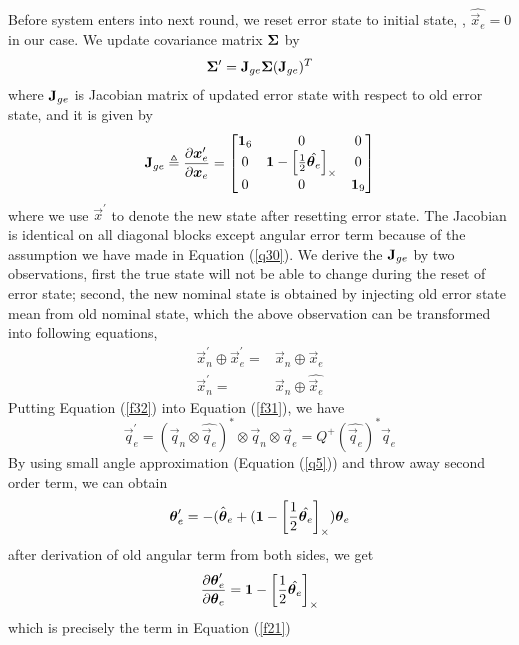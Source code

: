 Before system enters into next round, we reset error state to initial state, \ie, $\hat{\vec{x}_e} = 0$ in our case. We update covariance matrix $\mathbf{\Sigma}$ by
\begin{equation}\label{f20}
	\mathbf{\Sigma}^\prime = \mathbf{J}_{ge} \mathbf{\Sigma} (\mathbf{J}_{ge})^T
\end{equation}
where $\mathbf{J}_{ge}$ is Jacobian matrix of updated error state with respect to old error state, and it is given by
\begin{equation}\label{f21}
	\mathbf{J}_{ge} \triangleq \dfrac{\partial{\boldsymbol{x}_e^\prime}}{\partial{\boldsymbol{x}_e}} = \begin{bmatrix}
	\mathbf{1}_6 & 0 & 0 \\
	0 & \mathbf{1} - \left[ \frac{1}{2} \hat{\boldsymbol{\theta}_e} \right]_\times & 0 \\
	0 & 0 & \mathbf{1}_9 \\
	\end{bmatrix}
\end{equation}
where we use $\vec{x}^\prime$ to denote the new state after resetting error state. The Jacobian is identical on all diagonal blocks except angular error term because of the assumption we have made in Equation (\ref{q30}). We derive the $\mathbf{J}_{ge}$ by two observations, first the true state will not be able to change during the reset of error state; second, the new nominal state is obtained by injecting old error state mean from old nominal state, which the above observation can be transformed into following equations,
\begin{align}
	\label{f31}
	\vec{x}_n^\prime \oplus \vec{x}_e^\prime =& \vec{x}_n \oplus \vec{x}_e \\
	\label{f32}
	\vec{x}_n^\prime =& \vec{x}_n \oplus \hat{\vec{x}_e}
\end{align}
Putting Equation (\ref{f32}) into Equation (\ref{f31}), we have
\begin{equation}
	\vec{q}_e^\prime = (\vec{q}_n \otimes \hat{\vec{q}_e})^* \otimes \vec{q}_n \otimes \vec{q}_e = Q^+(\hat{\vec{q}_e})^*\vec{q}_e
\end{equation}
By using small angle approximation (Equation (\ref{q5})) and throw away second order term, we can obtain 
\begin{equation}
	\boldsymbol{\theta}_e^\prime = -\hat{(\boldsymbol{\theta}_e} + (\mathbf{1} - \left[ \frac{1}{2} \hat{\boldsymbol{\theta}_e} \right]_\times)\boldsymbol{\theta}_e
\end{equation}
after derivation of old angular term from both sides, we get 
\begin{equation}
	\dfrac{\partial{\boldsymbol{\theta}_e^\prime}}{\partial{\boldsymbol{\theta}_e}} = \mathbf{1} - \left[ \frac{1}{2} \hat{\boldsymbol{\theta}_e} \right]_\times
\end{equation}
which is precisely the term in Equation (\ref{f21})
